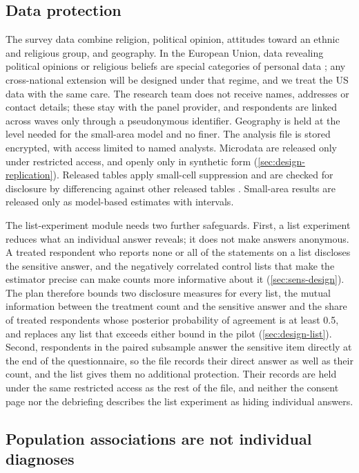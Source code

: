 \subsection{Data protection}\label{sec:ethics-data}

The survey data combine religion, political opinion, attitudes toward an ethnic and religious group, and geography. In the European Union, data revealing political opinions or religious beliefs are special categories of personal data \citep{gdpr2016}; any cross-national extension will be designed under that regime, and we treat the US data with the same care. The research team does not receive names, addresses or contact details; these stay with the panel provider, and respondents are linked across waves only through a pseudonymous identifier. Geography is held at the level needed for the small-area model and no finer. The analysis file is stored encrypted, with access limited to named analysts. Microdata are released only under restricted access, and openly only in synthetic form (\cref{sec:design-replication}). Released tables apply small-cell suppression and are checked for disclosure by differencing against other released tables \citep{hundepool2012}. Small-area results are released only as model-based estimates with intervals.

The list-experiment module needs two further safeguards. First, a list experiment reduces what an individual answer reveals; it does not make answers anonymous. A treated respondent who reports none or all of the statements on a list discloses the sensitive answer, and the negatively correlated control lists that make the estimator precise can make counts more informative about it (\cref{sec:sens-design}). The plan therefore bounds two disclosure measures for every list, the mutual information between the treatment count and the sensitive answer and the share of treated respondents whose posterior probability of agreement is at least 0.5, and replaces any list that exceeds either bound in the pilot (\cref{sec:design-list}). Second, respondents in the paired subsample answer the sensitive item directly at the end of the questionnaire, so the file records their direct answer as well as their count, and the list gives them no additional protection. Their records are held under the same restricted access as the rest of the file, and neither the consent page nor the debriefing describes the list experiment as hiding individual answers.

\subsection{Population associations are not individual diagnoses}\label{sec:ethics-individual}

